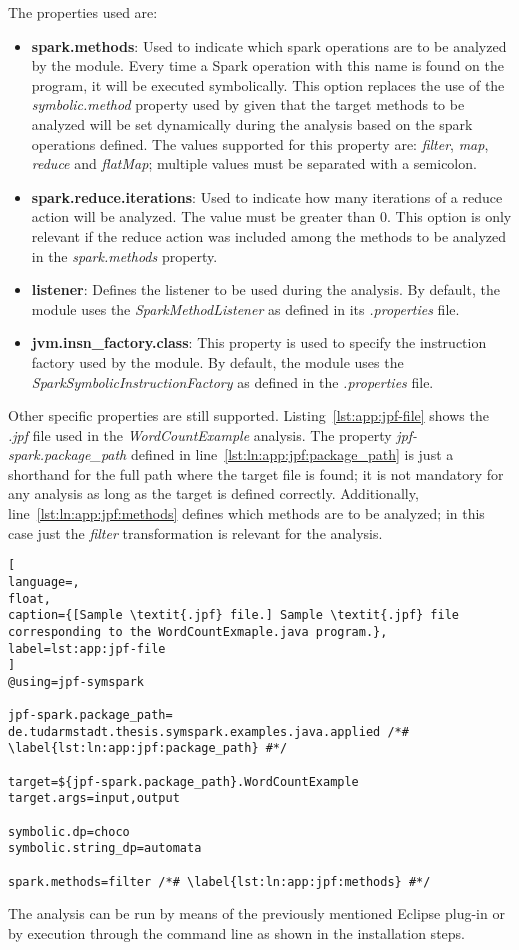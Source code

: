 The properties used are:

\begin{itemize}
	\item \textbf{spark.methods}: Used to indicate which spark operations are to be analyzed by the module. Every time a Spark operation with this name is found on the program, it will be executed symbolically. This option replaces the use of the \textit{symbolic.method} property used by \spf{} given that the target methods to be analyzed will be set dynamically during the analysis based on the spark operations defined. The values supported for this property are: \textit{filter}, \textit{map}, \textit{reduce} and \textit{flatMap}; multiple values must be separated with a semicolon.
	\item \textbf{spark.reduce.iterations}: Used to indicate how many iterations of a reduce action will be analyzed. The value must be greater than 0. This option is only relevant if the reduce action was included among the methods to be analyzed in the \textit{spark.methods} property.
	\item \textbf{listener}: Defines the listener to be used during the analysis. By default, the module uses the \textit{SparkMethodListener} as defined in its \textit{.properties} file.
	\item \textbf{jvm.insn\_factory.class}: This property is used to specify the instruction factory used by the module. By default, the module uses the \textit{SparkSymbolicInstructionFactory} as defined in the \textit{.properties} file.
\end{itemize}

Other \spf{} specific properties are still supported. Listing~\ref{lst:app:jpf-file} shows the \textit{.jpf} file used in the \textit{WordCountExample} analysis. The property \textit{jpf-spark.package\_path} defined in line~\ref{lst:ln:app:jpf:package_path} is just a shorthand for the full path where the target file is found; it is not mandatory for any analysis as long as the target is defined correctly. Additionally, line~\ref{lst:ln:app:jpf:methods} defines which methods are to be analyzed; in this case just the \textit{filter} transformation is relevant for the analysis.

\begin{lstlisting}[
language=,
float,
caption={[Sample \textit{.jpf} file.] Sample \textit{.jpf} file corresponding to the WordCountExmaple.java program.},
label=lst:app:jpf-file
]
@using=jpf-symspark

jpf-spark.package_path= de.tudarmstadt.thesis.symspark.examples.java.applied /*# \label{lst:ln:app:jpf:package_path} #*/

target=${jpf-spark.package_path}.WordCountExample
target.args=input,output

symbolic.dp=choco
symbolic.string_dp=automata

spark.methods=filter /*# \label{lst:ln:app:jpf:methods} #*/
\end{lstlisting}

The analysis can be run by means of the previously mentioned Eclipse plug-in or by execution through the command line as shown in the installation steps.
